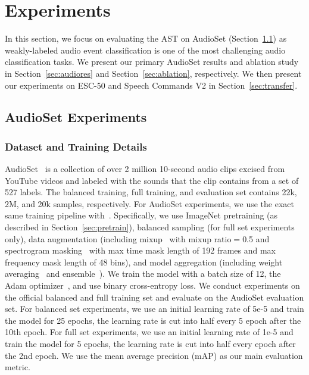 \documentclass[a4paper]{article}
\begin{document}
\section{Experiments}

In this section, we focus on evaluating the AST on AudioSet (Section~\ref{sec:audioset}) as weakly-labeled audio event classification is one of the most challenging audio classification tasks. We present our primary AudioSet results and ablation study in Section~\ref{sec:audiores} and Section~\ref{sec:ablation}, respectively. We then present our experiments on ESC-50 and Speech Commands V2 in Section~\ref{sec:transfer}.

\subsection{AudioSet Experiments}
\label{sec:audioset}
\subsubsection{Dataset and Training Details}
AudioSet~\cite{gemmeke2017audio} is a collection of over 2 million 10-second audio clips excised from YouTube videos and labeled with the sounds that the clip contains from a set of 527 labels. The balanced training, full training, and evaluation set contains 22k, 2M, and 20k samples, respectively. For AudioSet experiments, we use the exact same training pipeline with~\cite{gong2021psla}. Specifically, we use ImageNet pretraining (as described in Section~\ref{sec:pretrain}), balanced sampling (for full set experiments only), data augmentation (including mixup~\cite{tokozume2018learning} with mixup ratio$=$0.5 and spectrogram masking~\cite{park2019specaugment} with max time mask length of 192 frames and max frequency mask length of 48 bins), and model aggregation (including weight averaging~\cite{izmailov2018averaging} and ensemble~\cite{breiman1996bagging}). We train the model with a batch size of 12, the Adam optimizer~\cite{kingma2015adam}, and use binary cross-entropy loss. We conduct experiments on the official balanced and full training set and evaluate on the AudioSet evaluation set. For balanced set experiments, we use an initial learning rate of 5e-5 and train the model for 25 epochs, the learning rate is cut into half every 5 epoch after the 10th epoch. For full set experiments, we use an initial learning rate of 1e-5 and train the model for 5 epochs, the learning rate is cut into half every epoch after the 2nd epoch. We use the mean average precision (mAP) as our main evaluation metric.
\end{document}
